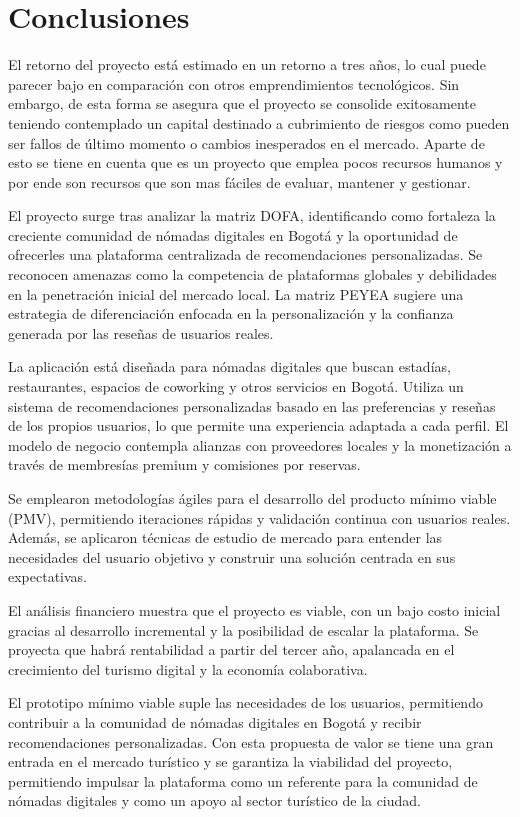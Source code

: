 \section{Conclusiones}

El retorno del proyecto está estimado en un retorno a tres años, lo cual puede parecer bajo en comparación con otros emprendimientos tecnológicos. Sin embargo, de esta forma se asegura que el proyecto se consolide exitosamente teniendo contemplado un capital destinado a cubrimiento de riesgos como pueden ser fallos de último momento o cambios inesperados en el mercado. Aparte de esto se tiene en cuenta que es un proyecto que emplea pocos recursos humanos y por ende son recursos que son mas fáciles de evaluar, mantener y gestionar. 

El proyecto surge tras analizar la matriz DOFA, identificando como fortaleza la creciente comunidad de nómadas digitales en Bogotá y la oportunidad de ofrecerles una plataforma centralizada de recomendaciones personalizadas. Se reconocen amenazas como la competencia de plataformas globales y debilidades en la penetración inicial del mercado local. La matriz PEYEA sugiere una estrategia de diferenciación enfocada en la personalización y la confianza generada por las reseñas de usuarios reales.

La aplicación está diseñada para nómadas digitales que buscan estadías, restaurantes, espacios de coworking y otros servicios en Bogotá. Utiliza un sistema de recomendaciones personalizadas basado en las preferencias y reseñas de los propios usuarios, lo que permite una experiencia adaptada a cada perfil. El modelo de negocio contempla alianzas con proveedores locales y la monetización a través de membresías premium y comisiones por reservas.

Se emplearon metodologías ágiles para el desarrollo del producto mínimo viable (PMV), permitiendo iteraciones rápidas y validación continua con usuarios reales. Además, se aplicaron técnicas de estudio de mercado para entender las necesidades del usuario objetivo y construir una solución centrada en sus expectativas.

El análisis financiero muestra que el proyecto es viable, con un bajo costo inicial gracias al desarrollo incremental y la posibilidad de escalar la plataforma. Se proyecta que habrá rentabilidad a partir del tercer año, apalancada en el crecimiento del turismo digital y la economía colaborativa.

El prototipo mínimo viable suple las necesidades de los usuarios, permitiendo contribuir a la comunidad de nómadas digitales en Bogotá y recibir recomendaciones personalizadas. Con esta propuesta de valor se tiene una gran entrada en el mercado turístico y se garantiza la viabilidad del proyecto, permitiendo impulsar la plataforma como un referente para la comunidad de nómadas digitales y como un apoyo al sector turístico de la ciudad.
